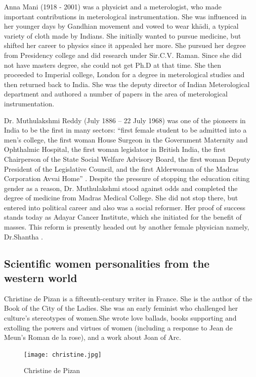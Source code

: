 \documentclass[a4paper,10pt]{article}
\begin{document}
\newblock
Anna Mani (1918 - 2001) was a physicist and a meterologist, who made important contributions in meterological instrumentation. She was influenced in her younger days by Gandhian movement and vowed to wear kh\={a}di, a typical variety of cloth made by Indians. She initially wanted to pursue medicine, but shifted her career to physics since it appealed her more. She pursued her degree from Presidency college and did research under Sir.C.V. Raman. Since she did not have masters degree, she could not get Ph.D at that time. She then proceeded to Imperial college, London for a degree in meterological studies and then returned back to India. She was the deputy director of Indian Meterological department and authored a number of papers in the area of meterological instrumentation. \cite{anna}

Dr. Muthulakshmi Reddy (July 1886 – 22 July 1968) was one of the pioneers in India to be the first in many sectors: ``first female student to be admitted into a men's college, the first woman House Surgeon in the Government Maternity and Ophthalmic Hospital, the first woman legislator in British India, the first Chairperson of the State Social Welfare Advisory Board, the first woman Deputy President of the Legislative Council, and the first Alderwoman of the Madras Corporation Avvai Home'' \cite{reddy}. Despite the pressure of stopping the education citing gender as a reason, Dr. Muthulakshmi stood against odds and completed the degree of medicine from Madras Medical College. She did not stop there, but entered into political career and also was a social reformer. Her proof of success stands today as Adayar Cancer Institute, which she initiated for the benefit of masses. This reform is presently headed out by another female physician namely, Dr.Shantha \cite{shantha}. 


\subsection{Scientific women personalities from the western world}
\newblock
Christine de Pizan is a fifteenth-century writer in France. She is the author of the Book of the City of the Ladies. She was an early feminist who challenged her culture's stereotypes of women.She wrote love ballads, books supporting and extolling the powers and virtues of women (including a response to Jean de Meun's Roman de la rose), and a work about Joan of Arc.\cite{christine}\\

\begin{center}
\begin{figure}[h]
\centering
 \texttt{[image: christine.jpg]}
 \caption{Christine de Pizan}
\end{figure}
\end{center}
\end{document}
